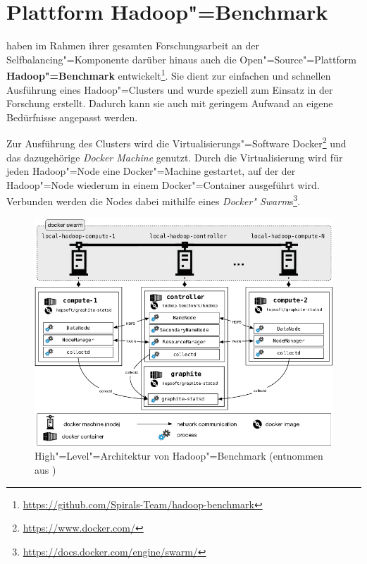 \section{Plattform Hadoop"=Benchmark}
\label{sec:hadoopBenchmark}

\citeauthor{Zhang2016} haben im Rahmen ihrer gesamten Forschungsarbeit an der Selfbalancing"=Komponente darüber hinaus auch die Open"=Source"=Plattform \textbf{Hadoop"=Benchmark} entwickelt\footnote{\url{https://github.com/Spirals-Team/hadoop-benchmark}}.
Sie dient zur einfachen und schnellen Ausführung eines Hadoop"=Clusters und wurde speziell zum Einsatz in der Forschung erstellt.
Dadurch kann sie auch mit geringem Aufwand an eigene Bedürfnisse angepasst werden.

Zur Ausführung des Clusters wird die Virtualisierungs"=Software Docker\footnote{\url{https://www.docker.com/}} und das dazugehörige \emph{Docker Machine} genutzt.
Durch die Virtualisierung wird für jeden Hadoop"=Node eine Docker"=Machine gestartet, auf der der Hadoop"=Node wiederum in einem Docker"=Container ausgeführt wird.
Verbunden werden die Nodes dabei mithilfe eines \emph{Docker" Swarm}s\footnote{\url{https://docs.docker.com/engine/swarm/}}.

\begin{figure}[h]
    \includegraphics{./resources/hadoopBenchmarkArch.png}
    \caption[High"=Level"=Architektur von Hadoop"=Benchmark]
    {High"=Level"=Architektur von Hadoop"=Benchmark (entnommen aus \cite{abb:hadoopBenchmarkArch})}
    \label{fig:hadoopBenchmarkArchitecture}
\end{figure}

